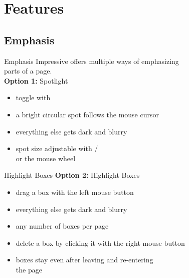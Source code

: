 \documentclass[bigger,hyperref={colorlinks=true,linkcolor=white,urlcolor=blue}]{beamer}
\begin{document}
\section{Features}

\subsection{Emphasis}
\begin{frame}{Emphasis}
    Impressive offers multiple ways of emphasizing \\
    parts of a page.
    \vspace{0.5cm} \\
    \textbf{Option 1:} {\glqq}Spotlight{\grqq}
    \begin{itemize}
        \item toggle with \Enter
        \item a bright circular spot follows the mouse cursor
        \item everything else gets dark and blurry
        \item spot size adjustable with \keystroke{+}/\keystroke{--} \\
              or the mouse wheel
    \end{itemize}
\end{frame}
\begin{frame}{Highlight Boxes}
    \textbf{Option 2:} Highlight Boxes
    \begin{itemize}
        \item drag a box with the left mouse button
        \item everything else gets dark and blurry
        \item any number of boxes per page
        \item delete a box by clicking it with the right mouse button
        \item boxes stay even after leaving and re-entering \\ the page
    \end{itemize}
\end{frame}
\end{document}
